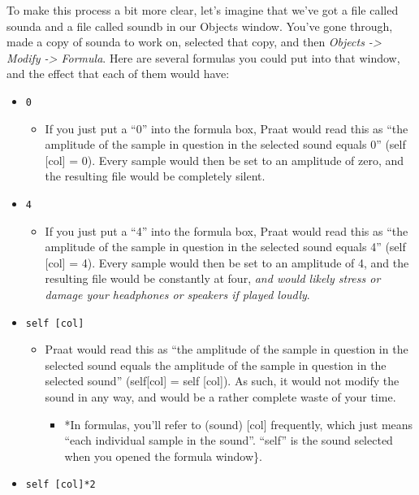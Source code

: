 \documentclass[11pt]{article}
\def\tightlist{}
\begin{document}
To make this process a bit more clear, let's imagine that we've got a
file called sounda and a file called soundb in our Objects window.
You've gone through, made a copy of sounda to work on, selected that
copy, and then \emph{Objects -\textgreater{} Modify -\textgreater{}
Formula}. Here are several formulas you could put into that window, and
the effect that each of them would have:

\begin{itemize}
\tightlist
\item
  \texttt{0}

  \begin{itemize}
  \tightlist
  \item
    If you just put a ``0'' into the formula box, Praat would read this
    as ``the amplitude of the sample in question in the selected sound
    equals 0'' (self {[}col{]} = 0). Every sample would then be set to
    an amplitude of zero, and the resulting file would be completely
    silent.
  \end{itemize}
\item
  \texttt{4}

  \begin{itemize}
  \tightlist
  \item
    If you just put a ``4'' into the formula box, Praat would read this
    as ``the amplitude of the sample in question in the selected sound
    equals 4'' (self {[}col{]} = 4). Every sample would then be set to
    an amplitude of 4, and the resulting file would be constantly at
    four, \emph{and would likely stress or damage your headphones or
    speakers if played loudly}.
  \end{itemize}
\item
  \texttt{self [col]}

  \begin{itemize}
  \tightlist
  \item
    Praat would read this as ``the amplitude of the sample in question
    in the selected sound equals the amplitude of the sample in question
    in the selected sound'' (self{[}col{]} = self {[}col{]}). As such,
    it would not modify the sound in any way, and would be a rather
    complete waste of your time.

    \begin{itemize}
    \tightlist
    \item
      *In formulas, you'll refer to (sound) {[}col{]} frequently, which
      just means ``each individual sample in the sound''. ``self'' is
      the sound selected when you opened the formula window\}.
    \end{itemize}
  \end{itemize}
\item
  \texttt{self [col]*2}


\end{itemize}
\end{document}

